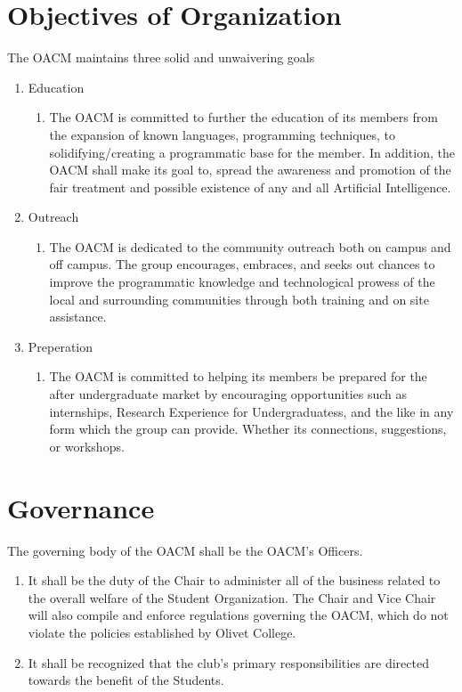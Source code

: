 \documentclass[letterpaper, 12pt]{article}
\begin{document}
\section{Objectives of Organization}
The OACM maintains three solid and unwaivering goals 
\begin{enumerate}
    \item Education
        \begin{enumerate}
            \item The OACM is committed to further the education of its 
                members from the expansion of known languages, programming 
                techniques, to solidifying/creating a programmatic base for 
                the member.
                In addition, the OACM shall make its goal to, spread the 
                awareness and promotion of the fair treatment and possible 
                existence of any and all Artificial Intelligence.
        \end{enumerate}
    \item Outreach
        \begin{enumerate}
            \item The OACM is dedicated to the community outreach both on 
                campus and off campus. The group encourages, embraces, and 
                seeks out chances to improve the programmatic knowledge and 
                technological prowess of the local and surrounding 
                communities through both training and on site assistance.
        \end{enumerate}
    \item Preperation
        \begin{enumerate}
            \item The OACM is committed to helping its members be prepared 
                for the after undergraduate market by encouraging 
                opportunities such as internships, Research Experience for 
                Undergraduatess, and the like in any form which the group 
                can provide. 
                Whether its connections, suggestions, or workshops.
        \end{enumerate}
\end{enumerate}
\section{Governance}
The governing body of the OACM shall be the OACM's Officers.
\begin{enumerate}
    \item It shall be the duty of the Chair to administer all of the business 
        related to the overall welfare of the Student Organization. 
        The Chair and Vice Chair will also compile and enforce regulations 
        governing the OACM, which do not violate the policies established by 
        Olivet College.
    \item It shall be recognized that the club's primary responsibilities are directed towards the benefit of the Students. 
\end{enumerate}
\end{document}
